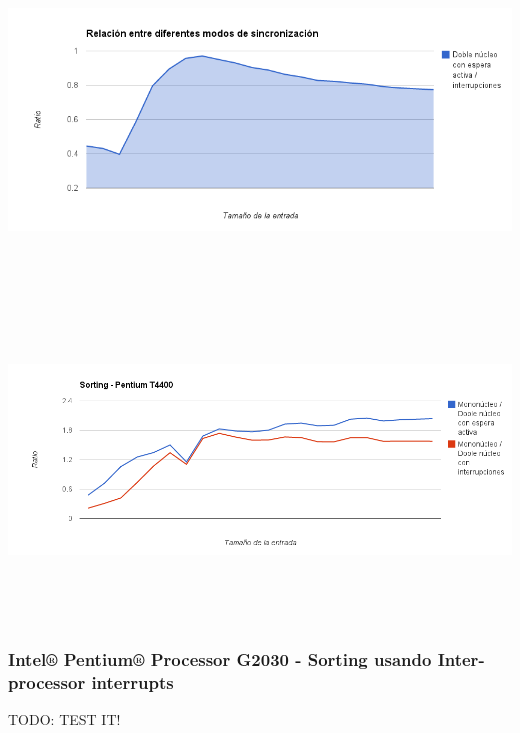 	\begin{center}
	    \includegraphics[height=8.5cm]{images/pentium_d_mem_ipi.png}
	\end{center}

	\begin{center}
	    \includegraphics[height=8.5cm]{images/pentium_d_gain_mono_mem_mono_ipi.png}
	\end{center}

\subsubsection{Intel® Pentium® Processor G2030 - Sorting usando Inter-processor interrupts}

TODO: TEST IT!